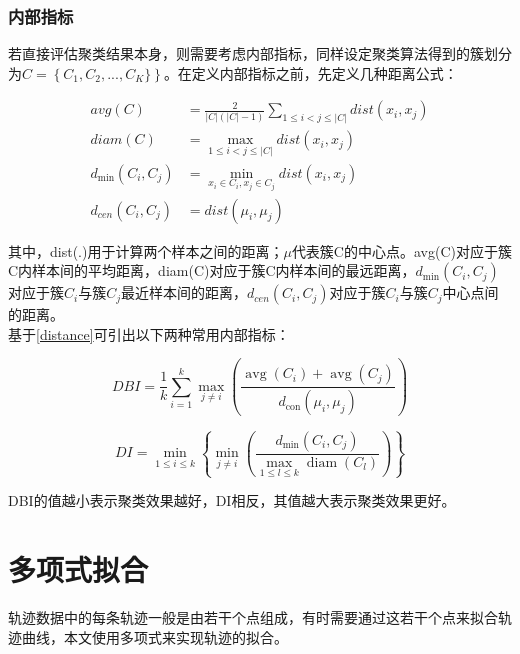 \subsubsection{内部指标}

若直接评估聚类结果本身，则需要考虑内部指标，同样设定聚类算法得到的簇划分为$C=\left\{C_1,C_2,...,C_K\}\right\}$。在定义内部指标之前，先定义几种距离公式：

\begin{equation}
\label{distance}
\begin{aligned}
avg(C) &=\frac{2}{|C|(|C|-1)} \sum_{1 \leqslant i<j \leqslant|C|} dist\left(x_{i}, x_{j}\right) \\
diam(C) &=\max _{1 \leqslant i<j \leqslant|C|} dist\left(x_{i}, x_{j}\right) \\
d_{\min }\left(C_{i}, C_{j}\right) &=\min _{x_{i} \in C_{i}, x_{j} \in C_{j}} dist\left(x_{i}, x_{j}\right) \\
d_{cen}\left(C_{i}, C_{j}\right) &=dist\left(\mu_{i}, \mu_{j}\right)
\end{aligned}
\end{equation}

其中，dist(.)用于计算两个样本之间的距离；$\mu$代表簇C的中心点。avg(C)对应于簇C内样本间的平均距离，diam(C)对应于簇C内样本间的最远距离，$d_{\min }\left(C_{i}, C_{j}\right)$对应于簇$C_i$与簇$C_j$最近样本间的距离，$d_{cen}\left(C_{i}, C_{j}\right)$对应于簇$C_i$与簇$C_j$中心点间的距离。\\
基于\ref{distance}可引出以下两种常用内部指标：

\begin{equation}
\label{DBI}
DBI=\frac{1}{k} \sum_{i=1}^{k} \max _{j \neq i}\left(\frac{\operatorname{avg}\left(C_{i}\right)+\operatorname{avg}\left(C_{j}\right)}{d_{\operatorname{con}}\left(\mu_{i}, \mu_{j}\right)}\right)
\end{equation}

\begin{equation}
\label{DI}
DI=\min _{1 \leqslant i \leqslant k}\left\{\min _{j \neq i}\left(\frac{d_{\min }\left(C_{i}, C_{j}\right)}{\max _{1 \leqslant l \leqslant k} \operatorname{diam}\left(C_{l}\right)}\right)\right\}
\end{equation}

DBI的值越小表示聚类效果越好，DI相反，其值越大表示聚类效果更好。






\section{多项式拟合}
轨迹数据中的每条轨迹一般是由若干个点组成，有时需要通过这若干个点来拟合轨迹曲线，本文使用多项式来实现轨迹的拟合。
